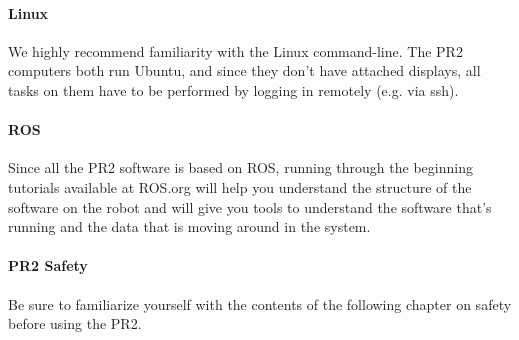 \paragraph{Linux} We highly recommend familiarity with the Linux command-line.  The PR2 computers both run Ubuntu, and since they don't have attached displays, all tasks on them have to be performed by logging in remotely (e.g. via ssh).
\paragraph{ROS} Since all the PR2 software is based on ROS, running through the beginning tutorials available at ROS.org will help you understand the structure of the software on the robot and will give you tools to understand the software that's running and the data that is moving around in the system.
\paragraph{PR2 Safety} Be sure to familiarize yourself with the contents of the following chapter on safety before using the PR2.
